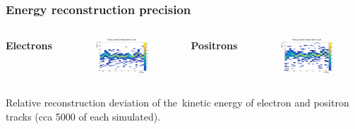 \documentclass{beamer}
\begin{document}
	\begin{frame}
		\frametitle{Energy reconstruction precision}
		\centering
		\begin{columns}
			\centering
			\Large \textbf{Electrons}
			\begin{figure}
				\centering
				\includegraphics[width = 0.95 \linewidth]{../images/h_e_deltaenergy_phi.png}
			\end{figure}
			\centering
			\Large \textbf{Positrons}
			\begin{figure}
				\centering
				\includegraphics[width = 0.95 \linewidth]{../images/h_p_deltaenergy_phi.png}
			\end{figure}
		\end{columns}
		\vspace{0.5cm}
		\footnotesize{Relative reconstruction deviation of the~kinetic energy of electron and positron tracks (cca 5000 of each simulated).}
	\end{frame}
\end{document}
